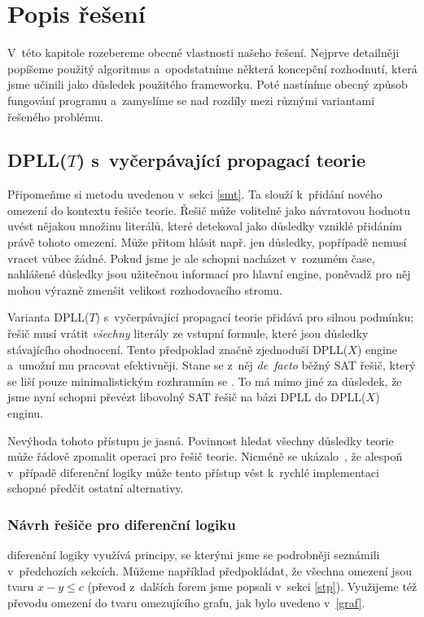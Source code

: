 \chapter{Popis řešení}

V~této kapitole rozebereme obecné vlastnosti našeho řešení. Nejprve detailněji popíšeme použitý algoritmus a~opodstatníme některá koncepční rozhodnutí, která jsme učinili jako důsledek použitého frameworku. Poté nastíníme obecný způsob fungování programu a~zamyslíme se nad rozdíly mezi různými variantami řešeného problému.

\section{DPLL($T$) s~vyčerpávající propagací teorie}\label{dpllt}

Připomeňme si metodu  uvedenou v~sekci \ref{smt}. Ta slouží k~přidání nového omezení do kontextu řešiče teorie. Řešič může volitelně jako návratovou hodnotu uvést nějakou množinu literálů, které detekoval jako důsledky vzniklé přidáním právě tohoto omezení. Může přitom hlásit např. jen  důsledky, popřípadě nemusí vracet vůbec žádné. Pokud jsme je ale schopni nacházet v~rozumém čase, nahlášené důsledky jsou užitečnou informací pro hlavní engine, poněvadž pro něj mohou výrazně zmenšit velikost rozhodovacího stromu.

Varianta DPLL($T$) s~vyčerpávající propagací teorie přidává pro  silnou podmínku; řešič musí vrátit \emph{všechny} literály ze vstupní formule, které jsou důsledky stávajícího ohodnocení. Tento předpoklad značně zjednoduší DPLL($X$) engine a~umožní mu pracovat efektivněji. Stane se z~něj \emph{de~facto} běžný SAT řešič, který se liší pouze minimalistickým rozhranním se \Solver. To má mimo jiné za důsledek, že jsme nyní schopni převézt libovolný SAT řešič na bázi DPLL do DPLL($X$) enginu.

Nevýhoda tohoto přístupu je jasná. Povinnost hledat všechny důsledky teorie může řádově zpomalit operaci  pro řešič teorie. Nicméně se ukázalo~\cite{Nieuwenhuis05}, že alespoň v~případě diferenční logiky může tento přístup vést k~rychlé implementaci schopné předčit ostatní alternativy.

\subsection{Návrh řešiče pro diferenční logiku}

\Solver diferenční logiky využívá principy, se kterými jsme se podrobněji seznámili v~předchozích sekcích. Můžeme například předpokládat, že všechna omezení jsou tvaru $x-y \leq c$ (převod z~dalších forem jsme popsali v~sekci \ref{stp}). Využijeme též převodu omezení do tvaru omezujícího grafu, jak bylo uvedeno v~\ref{graf}.

